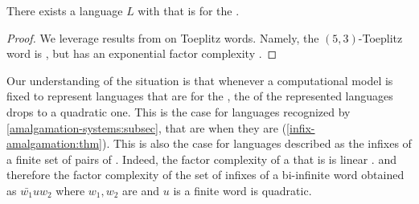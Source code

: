 \begin{lemma}
  \label{exponential-factor-complexity:lem}
  There exists a language $L$ with 
  that is  for the .
\end{lemma}
\begin{proof}
  We leverage results from \cite{CAKA97} on Toeplitz words.
  Namely, the 
  $(5, 3)$-Toeplitz word is  
  \cite[p. 499]{CAKA97},
  but has an exponential factor complexity 
  \cite[Theorem 5]{CAKA97}.
\end{proof}


Our understanding of the situation is that whenever a computational model is
fixed to represent languages that are  for the , the  of the represented languages drops to a
quadratic one. This is the case for languages recognized by  \cref{amalgamation-systems:subsec}, that are 
when they are  (\cref{infix-amalgamation:thm}). 
This is
also the case for languages described as the infixes of a finite set of pairs
of . Indeed, the factor complexity of a  that is  is linear \cite[Theorem 24]{NIPR09}.
and therefore the factor complexity of the set of infixes of a bi-infinite word
obtained as $\bar{w_1} u w_2$ where $w_1, w_2$ are  and
$u$ is a finite word is quadratic.


